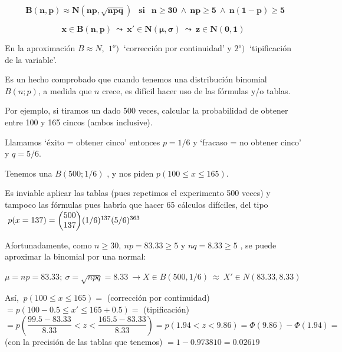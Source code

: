 \vspace{10mm}%
\begin{destacado}
	

	
 $$\ \ \boldsymbol{
B(n,p) \approx N(np,\sqrt{npq}) \ \ \text{ si } \ \ n	\ge 30 \ \wedge \  np \ge 5  \ \wedge \  n(1-p) \ge 5
}$$

	$$\boxed{ \ \  \boldsymbol{ x\in  B(n,p) \  \leadsto \ x'\in N(\mu,\sigma) \ \leadsto \ z\in N(0,1)}  \ \ }$$

\begin{small}	
En la aproximación $B\approx N$, $\ 1^o)\ $ `corrección por continuidad' y $2^o)\ $ `tipificación de la variable'. 
\end{small}
	
\end{destacado}



\vspace{4mm}%
\begin{example}

Es un hecho comprobado que cuando tenemos una distribución binomial $B(n;p)$, a medida que $n$ crece, es difícil hacer uso de las fórmulas y/o tablas.

\vspace{2mm} Por ejemplo, si tiramos un dado 500 veces, calcular la probabilidad de obtener entre 100 y 165 cincos (ambos inclusive).

\vspace{2mm} Llamamos   `éxito = obtener cinco' entonces $p = 1/6$ y `fracaso = no obtener cinco' y $q = 5/6$.

\vspace{2mm} Tenemos una $B (500; 1/6)$ , y nos piden $p(100 \le x \le 165)$.

\vspace{2mm} Es inviable aplicar las tablas (pues repetimos el experimento 500 veces) y tampoco las fórmulas pues habría que hacer 65 cálculos difíciles, del tipo 
  $\ p(x=137)=\mqty(500\\137)(1/6)^{137}(5/6)^{363}$
  
  
  \vspace{2mm} Afortunadamente, como
   $ n \ge  3 0 , \ n p = 83.33 \ge  5 \text { y }  n q  = 8. 3  3 \ge  5$ , se puede aproximar la binomial por una normal: 
   
   $\mu=np=83.33;\ \sigma=\sqrt{npq}=8.33 \ \to X \in B(500,1/6) \ \approx \ X'\in N(83.33,8.33)$
   
  \vspace{2mm}  Así, $\ p(100\le x \le 165)= $ \textcolor{gris}{(corrección por continuidad)} $ = p(100-0.5\le x' \le 165+0.5) =$ \textcolor{gris}{(tipificación)} $=p \left( \dfrac{99.5-83.33}{8.33} < z < \dfrac{165.5-83.33}{8.33} \right) = p( 1.94<z< 9.86)= \Phi(9.86)-\Phi(1.94)= $ \textcolor{gris}{(con la precisión de las tablas que tenemos)} $=1-0.973810=0.02619$

\end{example}	
	


